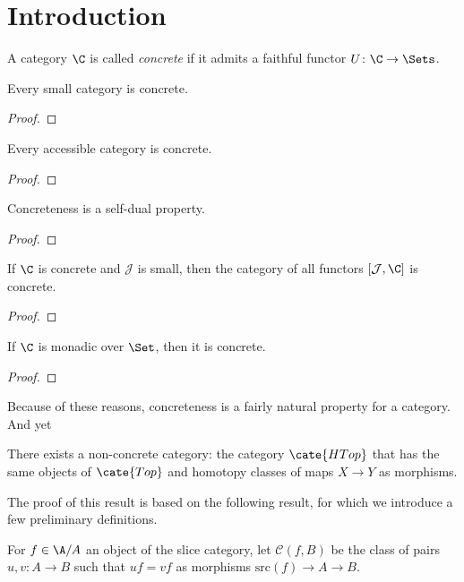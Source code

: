 \documentclass[12pt]{amsart}
\def\J{\mathcal{J}}
\begin{document}
\section{Introduction}
\begin{definition}
A category $\C$ is called \emph{concrete} if it admits a faithful functor $U\colon \C \to \Sets$.
\end{definition}
\begin{remark}
Every small category is concrete.
\end{remark}
\begin{proof}

\end{proof}
\begin{remark}\label{acc-is-conc}
Every accessible category is concrete.
\end{remark}
\begin{proof}

\end{proof}
\begin{remark}
Concreteness is a self-dual property.
\end{remark}
\begin{proof}

\end{proof}
\begin{remark}
If $\C$ is concrete and $\J$ is small, then the category of all functors $[\J, \C]$ is concrete.
\end{remark}
\begin{proof}

\end{proof}
\begin{remark}
If $\C$ is monadic over $\Set$, then it is concrete.
\end{remark}
\begin{proof}

\end{proof}
Because of these reasons, concreteness is a fairly natural property for a category. And yet
\begin{proposition}\cite{Freydconc}
There exists a non-concrete category: the category $\cate{HTop}$ that has the same objects of $\cate{Top}$ and homotopy classes of maps $X \to Y$ as morphisms.
\end{proposition}
The proof of this result is based on the following result, for which we introduce a few preliminary definitions.

For $f\in \A/A$ an object of the slice category, let $\mathcal{C}(f,B)$ be the class of pairs $u,v : A \to B$ such that $uf=vf$ as morphisms $\text{src}(f) \to A \to B$.
\end{document}
